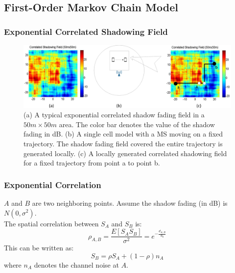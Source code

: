 \documentclass{beamer}
\newtheorem{lem}[thm]{Lemma}
\begin{document}
\subsection{First-Order Markov Chain Model}
\begin{frame}
\frametitle{Exponential Correlated Shadowing Field}
\begin{figure}
\includegraphics[width=12cm]{finalsystemab_V3.eps}
\caption{(a) A typical exponential correlated shadow fading field in a $50m\times50m$ area. The color bar denotes the value of the shadow fading in dB. (b) A single cell model with a MS moving on a fixed trajectory. The shadow fading field covered the entire trajectory is generated locally. (c) A locally generated correlated shadowing field for a fixed trajectory from point a to point b.}
\end{figure}
\end{frame}
%
\begin{frame}
\frametitle{Exponential Correlation}
$A$ and $B$ are two neighboring points. Assume the shadow fading (in dB) is $N(0,\sigma^{2})$.\\
The spatial correlation between $S_{A}$ and $S_{B}$ is:
\begin{equation}
\rho_{A,B} = \frac{E[S_{A}S_{B}]}{\sigma^{2}}=e^{-\frac{d_{A,B}}{d_{0}}}
\end{equation}
This can be written as:
\begin{equation}
S_{B}=\rho S_{A}+(1-\rho)n_{A}
\end{equation}
where $n_{A}$ denotes the channel noise at $A$.
\end{frame}
%
\end{document}
